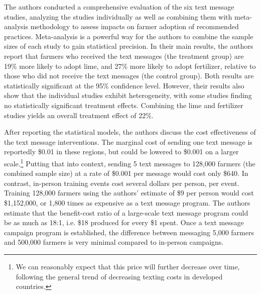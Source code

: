 \documentclass[12pt]{article}
\begin{document}
The authors conducted a comprehensive evaluation of the six text message studies, analyzing the studies individually as well as combining them with meta-analysis methodology to assess impacts on farmer adoption of recommended practices. Meta-analysis is a powerful way for the authors to combine the sample sizes of each study to gain statistical precision. In their main results, the authors report that farmers who received the text messages (the treatment group) are 19\% more likely to adopt lime, and 27\% more likely to adopt fertilizer, relative to those who did not receive the text messages (the control group). Both results are statistically significant at the 95\% confidence level. However, their results also show that the individual studies exhibit heterogeneity, with some studies finding no statistically significant treatment effects. Combining the lime and fertilizer studies yields an overall treatment effect of 22\%.

After reporting the statistical models, the authors discuss the cost effectiveness of the text message interventions. The marginal cost of sending one text message is reportedly \$0.01 in these regions, but could be lowered to \$0.001 on a larger scale.\footnote{We can reasonably expect that this price will further decrease over time, following the general trend of decreasing texting costs in developed countries.} Putting that into context, sending 5 text messages to 128,000 farmers (the combined sample size) at a rate of \$0.001 per message would cost only \$640. In contrast, in-person training events cost several dollars per person, per event. Training 128,000 farmers using the authors' estimate of \$9 per person would cost \$1,152,000, or 1,800 times as expensive as a text message program. The authors estimate that the benefit-cost ratio of a large-scale text message program could be as much as 18:1, i.e. \$18 produced for every \$1 spent. Once a text message campaign program is established, the difference between messaging 5,000 farmers and 500,000 farmers is very minimal compared to in-person campaigns.
\end{document}
